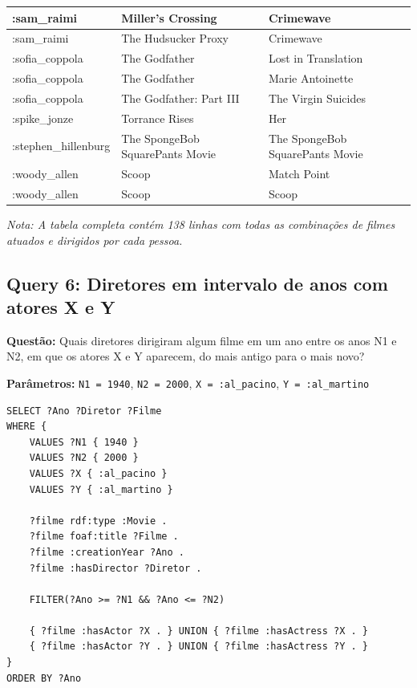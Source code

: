 \documentclass[12pt,a4paper]{article}
\begin{document}
\begin{longtable}{|l|p{4.5cm}|p{4.5cm}|}
\hline
:sam\_raimi & Miller's Crossing & Crimewave \\
\hline
:sam\_raimi & The Hudsucker Proxy & Crimewave \\
\hline
:sofia\_coppola & The Godfather & Lost in Translation \\
\hline
:sofia\_coppola & The Godfather & Marie Antoinette \\
\hline
:sofia\_coppola & The Godfather: Part III & The Virgin Suicides \\
\hline
:spike\_jonze & Torrance Rises & Her \\
\hline
:stephen\_hillenburg & The SpongeBob SquarePants Movie & The SpongeBob SquarePants Movie \\
\hline
:woody\_allen & Scoop & Match Point \\
\hline
:woody\_allen & Scoop & Scoop \\
\hline
\end{longtable}

\textit{Nota: A tabela completa contém 138 linhas com todas as combinações de filmes atuados e dirigidos por cada pessoa.}
\newpage
\subsection{Query 6: Diretores em intervalo de anos com atores X e Y}

\textbf{Questão:} Quais diretores dirigiram algum filme em um ano entre os anos N1 e N2, em que os atores X e Y aparecem, do mais antigo para o mais novo?

\textbf{Parâmetros:} \texttt{N1 = 1940}, \texttt{N2 = 2000}, \texttt{X = :al\_pacino}, \texttt{Y = :al\_martino}

\begin{lstlisting}
SELECT ?Ano ?Diretor ?Filme
WHERE {
    VALUES ?N1 { 1940 }
    VALUES ?N2 { 2000 }
    VALUES ?X { :al_pacino }
    VALUES ?Y { :al_martino }
    
    ?filme rdf:type :Movie .
    ?filme foaf:title ?Filme .
    ?filme :creationYear ?Ano .
    ?filme :hasDirector ?Diretor .
    
    FILTER(?Ano >= ?N1 && ?Ano <= ?N2)
    
    { ?filme :hasActor ?X . } UNION { ?filme :hasActress ?X . }
    { ?filme :hasActor ?Y . } UNION { ?filme :hasActress ?Y . }
}
ORDER BY ?Ano
\end{lstlisting}
\end{document}
